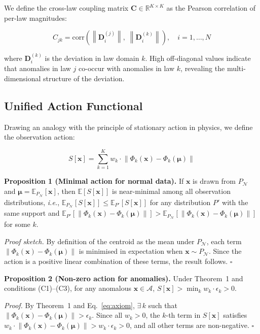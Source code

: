 \documentclass[journal]{IEEEtran}
\newcommand{\ie}{\textit{i.e.}}
\newcommand{\R}{\mathbb{R}}
\newcommand{\E}{\mathbb{E}}
\newcommand{\norm}[1]{\left\lVert#1\right\rVert}
\begin{document}
We define the cross-law coupling matrix $\mathbf{C} \in \R^{K \times K}$ as the Pearson correlation of per-law magnitudes:

\begin{equation}
C_{jk} = \text{corr}\!\left(\norm{\mathbf{D}_i^{(j)}},\; \norm{\mathbf{D}_i^{(k)}}\right), \quad i = 1,\ldots,N
\label{eq:coupling}
\end{equation}

where $\mathbf{D}_i^{(k)}$ is the deviation in law domain $k$. High off-diagonal values indicate that anomalies in law $j$ co-occur with anomalies in law $k$, revealing the multi-dimensional structure of the deviation.

\subsection{Unified Action Functional}
\label{ssec:action}

Drawing an analogy with the principle of stationary action in physics, we define the observation action:

\begin{equation}
S[\mathbf{x}] = \sum_{k=1}^{K} w_k \cdot \norm{\Phi_k(\mathbf{x}) - \Phi_k(\boldsymbol{\mu})}
\label{eq:action}
\end{equation}

\textbf{Proposition 1 (Minimal action for normal data).} If $\mathbf{x}$ is drawn from $P_{\mathcal{N}}$ and $\boldsymbol{\mu} = \E_{P_{\mathcal{N}}}[\mathbf{x}]$, then $\E[S[\mathbf{x}]]$ is near-minimal among all observation distributions, \ie, $\E_{P_{\mathcal{N}}}[S[\mathbf{x}]] \leq \E_{P'}[S[\mathbf{x}]]$ for any distribution $P'$ with the same support and $\E_{P'}[\norm{\Phi_k(\mathbf{x}) - \Phi_k(\boldsymbol{\mu})}] > \E_{P_{\mathcal{N}}}[\norm{\Phi_k(\mathbf{x}) - \Phi_k(\boldsymbol{\mu})}]$ for some $k$.

\textit{Proof sketch.} By definition of the centroid as the mean under $P_{\mathcal{N}}$, each term $\norm{\Phi_k(\mathbf{x}) - \Phi_k(\boldsymbol{\mu})}$ is minimised in expectation when $\mathbf{x} \sim P_{\mathcal{N}}$. Since the action is a positive linear combination of these terms, the result follows. $\square$

\textbf{Proposition 2 (Non-zero action for anomalies).} Under Theorem~1 and conditions (C1)--(C3), for any anomalous $\mathbf{x} \in \mathcal{A}$, $S[\mathbf{x}] > \min_k w_k \cdot \epsilon_k > 0$.

\textit{Proof.} By Theorem~1 and Eq.~\eqref{eq:axiom}, $\exists\, k$ such that $\norm{\Phi_k(\mathbf{x}) - \Phi_k(\boldsymbol{\mu})} > \epsilon_k$. Since all $w_k > 0$, the $k$-th term in $S[\mathbf{x}]$ satisfies $w_k \cdot \norm{\Phi_k(\mathbf{x}) - \Phi_k(\boldsymbol{\mu})} > w_k \cdot \epsilon_k > 0$, and all other terms are non-negative. $\square$
\end{document}
